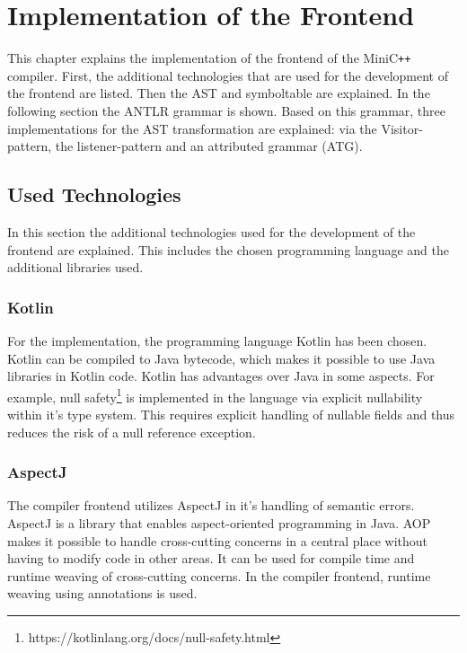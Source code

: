 \chapter{Implementation of the Frontend}

This chapter explains the implementation of the frontend of the MiniC\verb|++| compiler. First, the additional technologies that are used for the development of the frontend are listed. Then the AST and symboltable are explained. In the following section the ANTLR grammar is shown. Based on this grammar, three implementations for the AST transformation are explained: via the Visitor-pattern, the listener-pattern and an attributed grammar (ATG). 

\section{Used Technologies}

In this section the additional technologies used for the development of the frontend are explained. This includes the chosen programming language and the additional libraries used.

\subsection{Kotlin}

For the implementation, the programming language Kotlin has been chosen. Kotlin can be compiled to Java bytecode, which makes it possible to use Java libraries in Kotlin code. Kotlin has advantages over Java in some aspects. For example, null safety\footnote{https://kotlinlang.org/docs/null-safety.html} is implemented in the language via explicit nullability within it's type system. This requires explicit handling of nullable fields and thus reduces the risk of a null reference exception. 

\subsection{AspectJ}

The compiler frontend utilizes AspectJ in it's handling of semantic errors. AspectJ is a library that enables aspect-oriented programming in Java. AOP makes it possible to handle cross-cutting concerns in a central place without having to modify code in other areas. It can be used for compile time and runtime weaving of cross-cutting concerns. In the compiler frontend, runtime weaving using annotations is used.  

